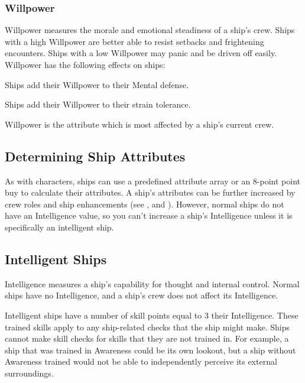     \subsubsection{Willpower}
      Willpower measures the morale and emotional steadiness of a ship's crew.
      Ships with a high Willpower are better able to resist setbacks and frightening encounters.
      Ships with a low Willpower may panic and be driven off easily.
      Willpower has the following effects on ships:
      \begin{raggeditemize}
        \item Ships add their Willpower to their Mental defense.
        \item Ships add their Willpower to their strain tolerance.
      \end{raggeditemize}

      Willpower is the attribute which is most affected by a ship's current crew.

  \subsection{Determining Ship Attributes}
    As with characters, ships can use a predefined attribute array or an 8-point point buy to calculate their attributes.
    A ship's attributes can be further increased by crew roles and ship enhancements (see , and ).
    However, normal ships do not have an Intelligence value, so you can't increase a ship's Intelligence unless it is specifically an intelligent ship.

  \subsection{Intelligent Ships}\label{Intelligent Ships}
    Intelligence measures a ship's capability for thought and internal control.
    Normal ships have no Intelligence, and a ship's crew does not affect its Intelligence.

    Intelligent ships have a number of skill points equal to 3 \add their Intelligence.
    These trained skills apply to any ship-related checks that the ship might make.
    Ships cannot make skill checks for skills that they are not trained in.
    For example, a ship that was trained in Awareness could be its own lookout, but a ship without Awareness trained would not be able to independently perceive its external surroundings.

